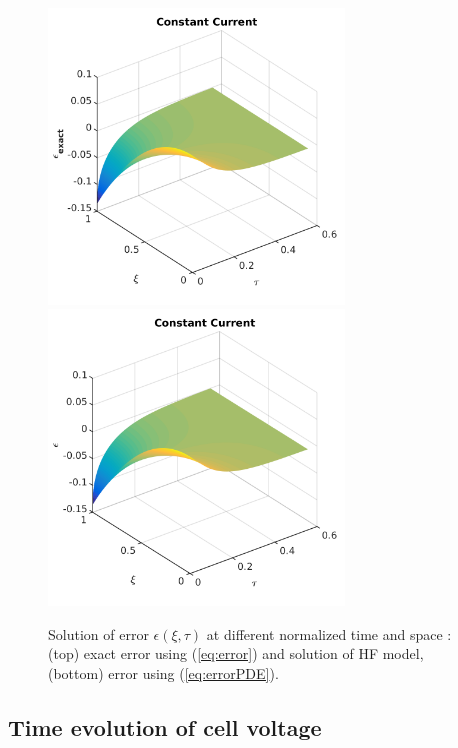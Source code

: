 \documentclass[]{article}
\begin{document}
\begin{figure}[h]
    \centering
    \includegraphics[trim = 0in 0in 0in 0in, clip, width=0.7\textwidth]{figures/error3d_exact.png}
    \\
    \includegraphics[trim = 0in 0in 0in 0in, clip, width=0.7\textwidth]{figures/error3d.png}      
    \caption{Solution of error $\epsilon(\xi,\tau)$ at different normalized time and space : (top) exact error using (\ref{eq:error}) and solution of HF model, (bottom) error using (\ref{eq:errorPDE}).}
    \label{fig:error_3d}
\end{figure}



\subsection{Time evolution of cell voltage}
\end{document}
